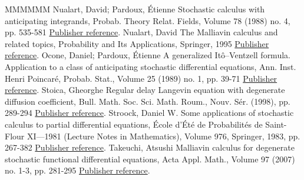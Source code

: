 \begin{thebibliography}{MMMMMM}
 Nualart, David; Pardoux, Étienne Stochastic calculus with anticipating integrands, Probab. Theory Relat. Fields, Volume 78 (1988) no. 4, pp. 535-581 \href{https://ahl.centre-mersenne.org/item/AHL_2020__3__1023_0/#nualart1988stochastic}{Publisher reference}.
 Nualart, David The Malliavin calculus and related topics, Probability and Its Applications, Springer, 1995 \href{https://ahl.centre-mersenne.org/item/AHL_2020__3__1023_0/#Nualart2006}{Publisher reference}.
 Ocone, Daniel; Pardoux, Étienne A generalized Itô–Ventzell formula. Application to a class of anticipating stochastic differential equations, Ann. Inst. Henri Poincaré, Probab. Stat., Volume 25 (1989) no. 1, pp. 39-71 \href{https://ahl.centre-mersenne.org/item/AHL_2020__3__1023_0/#ocone1989generalized}{Publisher reference}.
 Stoica, Gheorghe Regular delay Langevin equation with degenerate diffusion coefficient, Bull. Math. Soc. Sci. Math. Roum., Nouv. Sér. (1998), pp. 289-294 \href{https://ahl.centre-mersenne.org/item/AHL_2020__3__1023_0/#stoica1998}{Publisher reference}.
 Stroock, Daniel W. Some applications of stochastic calculus to partial differential equations, École d’Été de Probabilités de Saint-Flour XI—1981 (Lecture Notes in Mathematics), Volume 976, Springer, 1983, pp. 267-382 \href{https://ahl.centre-mersenne.org/item/AHL_2020__3__1023_0/#ST83}{Publisher reference}.
 Takeuchi, Atsushi Malliavin calculus for degenerate stochastic functional differential equations, Acta Appl. Math., Volume 97 (2007) no. 1-3, pp. 281-295 \href{https://ahl.centre-mersenne.org/item/AHL_2020__3__1023_0/#takeuchi2007a}{Publisher reference}.
\end{thebibliography}
